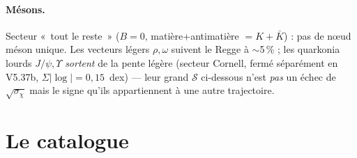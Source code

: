 \documentclass[11pt]{article}
\begin{document}
\paragraph{Mésons.}
Secteur «~tout le reste~» ($B=0$, matière+antimatière $=K+\bar K$) : pas de nœud méson unique. Les vecteurs légers $\rho,\omega$ suivent le Regge à $\sim$5\,\% ; les quarkonia lourds $J/\psi,\Upsilon$ \emph{sortent} de la pente légère (secteur Cornell, fermé séparément en V5.37b, $\Sigma|\log|=0{,}15$~dex) --- leur grand $\mathcal{S}$ ci-dessous n'est \emph{pas} un échec de $\sqrt{\sigma_\chi}$ mais le signe qu'ils appartiennent à une autre trajectoire.

\section{Le catalogue}
\end{document}
